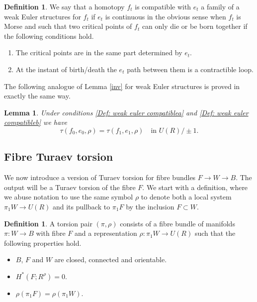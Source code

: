 \documentclass[11pt]{article}
\numberwithin{equation}{section}\providecommand{\dpl}{\displaystyle}
\newenvironment{enumeratea}
{\bgroup\def\theenumi{\alph{enumi}}\begin{enumerate}}
{\end{enumerate}\egroup}
\theoremstyle{plain}
\newtheorem{lemma}[theorem]{Lemma}
\theoremstyle{definition}
\newtheorem{definition}[theorem]{Definition}
\begin{document}
\begin{definition}\label{Def: weak euler compatible} We say that a homotopy $f_t$ is compatible with $e_t$ a family of a weak Euler structures for $f_t$ if $e_t$ is continuous in the obvious sense when $f_t$ is Morse and such that two critical points of $f_t$ can only die or be born together if the following conditions hold.

\begin{enumeratea}
\item\label{Def: weak euler compatiblea}
The critical points are in the same part determined by $e_t$.
\item\label{Def: weak euler compatibleb}
At the instant of birth/death the $e_t$ path between them is a contractible loop.
\end{enumeratea}
\end{definition}

The following analogue of Lemma \ref{inv} for weak Euler structures is proved in exactly the same way.
\begin{lemma}\label{weakinv}
Under conditions \eqref{Def: weak euler compatiblea} and \eqref{Def: weak euler compatibleb} we have
\[
\tau(f_0,e_0, \rho)=\tau(f_1,e_1, \rho)\quad\text{in }U(R) / \pm1.
\]
\end{lemma}

\subsection{Fibre Turaev torsion}

We now introduce a version of Turaev torsion for fibre bundles $F \to W \to B$. The output will be a Turaev torsion of the fibre $F$. We start with a definition, where we abuse notation to use the same symbol $\rho$ to denote both a local system $\pi_1 W \to U(R)$ and its pullback to $\pi_1F$ by the inclusion $F \subset W$.

\begin{definition}\label{torsionpair}
A torsion pair $(\pi, \rho)$ consists of a fibre bundle of manifolds \hbox{$\pi: W \to B$} with fibre $F$ and a representation $\rho: \pi_1W \to U(R)$ such that the following properties hold.
\begin{itemize}
\item $B$, $F$ and $W$ are closed, connected and orientable.
\item $H^*(F; R^\rho)=0$.
\item $\rho(\pi_1F)=\rho(\pi_1W)$.
\end{itemize}
\end{definition}
\end{document}
